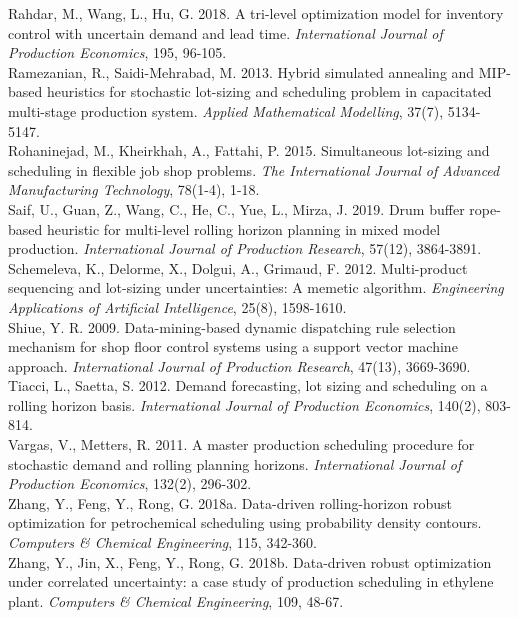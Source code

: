 \documentclass[letterpaper]{article} %
\begin{document}
Rahdar, M., Wang, L., Hu, G. 2018. A tri-level optimization model for inventory control with uncertain demand and lead time.  \textit{International Journal of Production Economics}, 195, 96-105.\\
Ramezanian, R., Saidi-Mehrabad, M. 2013. Hybrid simulated annealing and MIP-based heuristics for stochastic lot-sizing and scheduling problem in capacitated multi-stage production system.  \textit{Applied Mathematical Modelling}, 37(7), 5134-5147.\\
Rohaninejad, M., Kheirkhah, A., Fattahi, P. 2015. Simultaneous lot-sizing and scheduling in flexible job shop problems.  \textit{The International Journal of Advanced Manufacturing Technology}, 78(1-4), 1-18.\\
Saif, U., Guan, Z., Wang, C., He, C., Yue, L., Mirza, J. 2019. Drum buffer rope-based heuristic for multi-level rolling horizon planning in mixed model production.  \textit{International Journal of Production Research}, 57(12), 3864-3891.\\
Schemeleva, K., Delorme, X., Dolgui, A., Grimaud, F. 2012. Multi-product sequencing and lot-sizing under uncertainties: A memetic algorithm.  \textit{Engineering Applications of Artificial Intelligence}, 25(8), 1598-1610.\\
Shiue, Y. R. 2009. Data-mining-based dynamic dispatching rule selection mechanism for shop floor control systems using a support vector machine approach.  \textit{International Journal of Production Research}, 47(13), 3669-3690.\\
Tiacci, L., Saetta, S. 2012. Demand forecasting, lot sizing and scheduling on a rolling horizon basis.  \textit{International Journal of Production Economics}, 140(2), 803-814.\\
Vargas, V., Metters, R. 2011. A master production scheduling procedure for stochastic demand and rolling planning horizons.  \textit{International Journal of Production Economics}, 132(2), 296-302.\\
Zhang, Y., Feng, Y., Rong, G. 2018a. Data-driven rolling-horizon robust optimization for petrochemical scheduling using probability density contours.  \textit{Computers \& Chemical Engineering}, 115, 342-360.\\
Zhang, Y., Jin, X., Feng, Y., Rong, G. 2018b. Data-driven robust optimization under correlated uncertainty: a case study of production scheduling in ethylene plant.  \textit{Computers \& Chemical Engineering}, 109, 48-67.\\
\end{document}
